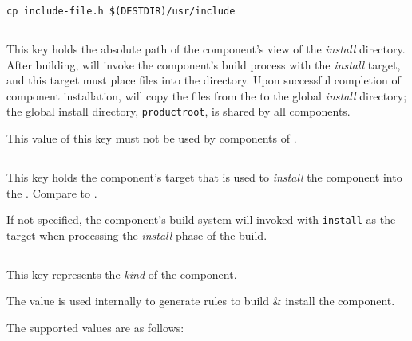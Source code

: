 \begin{verbatim}
cp include-file.h $(DESTDIR)/usr/include
\end{verbatim}


\subsection{}\label{variables:install-directory}

This key holds the absolute path of the component's view of the
\emph{install} directory.  After building, \lmsbw will invoke the
component's build process with the \emph{install} target, and this
target must place files into the \destdir directory.  Upon successful
completion of component installation, \lmsbw will copy the files from
the \destdir to the global \emph{install} directory; the global
install directory, \texttt{productroot}, is shared by all components.

This value of this key must not be used by components of \lmsbw.


\subsection{}\label{variables:install-target}

This key holds the component's \makefile target that is used to
\emph{install} the component into the \destdir.  Compare to
.

If not specified, the component's build system will invoked with
\texttt{install} as the target when processing the \emph{install}
phase of the build.

\label{variables:install-target}

\subsection{}\label{variables:kind}

This key represents the \emph{kind} of the component.

The value is used internally to generate \make rules to build \&
install the component.

The supported values are as follows:

